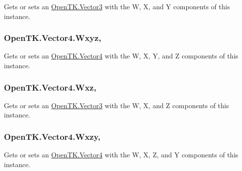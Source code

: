 Gets or sets an \hyperlink{struct_open_t_k_1_1_vector3}{Open\-T\-K.\-Vector3} with the W, X, and Y components of this instance. 

\hypertarget{struct_open_t_k_1_1_vector4_ab30f659b21a1510672cd55e801feb81a}{
\subsubsection[{Wxyz}]{ Open\-T\-K.\-Vector4.\-Wxyz\hspace{0.3cm}{\ttfamily [get]}, {\ttfamily [set]}}}\label{struct_open_t_k_1_1_vector4_ab30f659b21a1510672cd55e801feb81a}


Gets or sets an \hyperlink{struct_open_t_k_1_1_vector4}{Open\-T\-K.\-Vector4} with the W, X, Y, and Z components of this instance. 

\hypertarget{struct_open_t_k_1_1_vector4_a8404d3e04b4c44ce26ba521c4449adf4}{
\subsubsection[{Wxz}]{ Open\-T\-K.\-Vector4.\-Wxz\hspace{0.3cm}{\ttfamily [get]}, {\ttfamily [set]}}}\label{struct_open_t_k_1_1_vector4_a8404d3e04b4c44ce26ba521c4449adf4}


Gets or sets an \hyperlink{struct_open_t_k_1_1_vector3}{Open\-T\-K.\-Vector3} with the W, X, and Z components of this instance. 

\hypertarget{struct_open_t_k_1_1_vector4_abee347ee58abac0cae1c63acc7f9e45a}{
\subsubsection[{Wxzy}]{ Open\-T\-K.\-Vector4.\-Wxzy\hspace{0.3cm}{\ttfamily [get]}, {\ttfamily [set]}}}\label{struct_open_t_k_1_1_vector4_abee347ee58abac0cae1c63acc7f9e45a}


Gets or sets an \hyperlink{struct_open_t_k_1_1_vector4}{Open\-T\-K.\-Vector4} with the W, X, Z, and Y components of this instance. 

